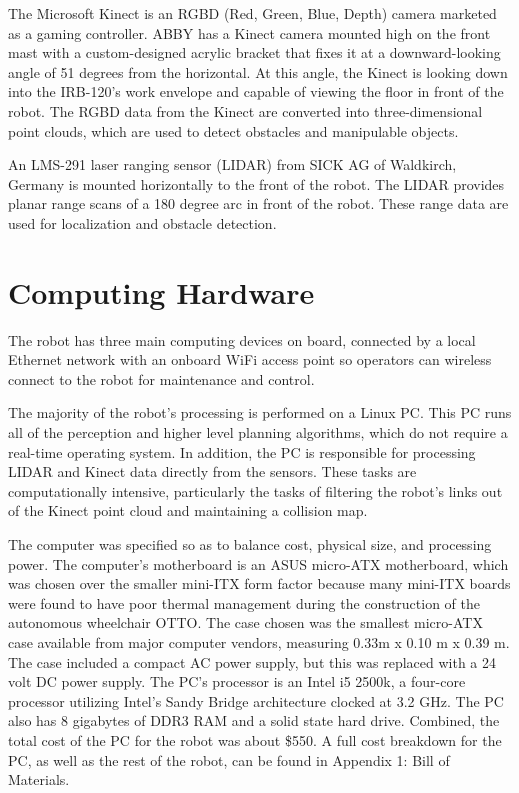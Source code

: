 \documentclass[]{cwru} %
\begin{document}
The Microsoft Kinect is an RGBD (Red, Green, Blue, Depth) camera
marketed as a gaming controller. ABBY has a Kinect camera mounted high
on the front mast with a custom-designed acrylic bracket that fixes it
at a downward-looking angle of 51 degrees from the horizontal. At this
angle, the Kinect is looking down into the IRB-120's work envelope and
capable of viewing the floor in front of the robot. The RGBD data from
the Kinect are converted into three-dimensional point clouds, which are
used to detect obstacles and manipulable objects.

An LMS-291 laser ranging sensor (LIDAR) from SICK AG of Waldkirch,
Germany is mounted horizontally to the front of the robot. The LIDAR
provides planar range scans of a 180 degree arc in front of the robot.
These range data are used for localization and obstacle detection.

\section{Computing Hardware}
\label{computing-hw}

The robot has three main computing devices on board, connected by a
local Ethernet network with an onboard WiFi access point so operators
can wireless connect to the robot for maintenance and control.

The majority of the robot's processing is performed on a Linux PC. This
PC runs all of the perception and higher level planning algorithms,
which do not require a real-time operating system. In addition, the PC
is responsible for processing LIDAR and Kinect data directly from the
sensors. These tasks are computationally intensive, particularly the
tasks of filtering the robot's links out of the Kinect point cloud and
maintaining a collision map.

The computer was specified so as to balance cost, physical size, and
processing power. The computer's motherboard is an ASUS micro-ATX
motherboard, which was chosen over the smaller mini-ITX form factor
because many mini-ITX boards were found to have poor thermal management
during the construction of the autonomous wheelchair OTTO. The case
chosen was the smallest micro-ATX case available from major computer
vendors, measuring 0.33m x 0.10 m x 0.39 m. The case included a compact
AC power supply, but this was replaced with a 24 volt DC power supply.
The PC's processor is an Intel i5 2500k, a four-core processor utilizing
Intel's Sandy Bridge architecture clocked at 3.2 GHz. The PC also has 8
gigabytes of DDR3 RAM and a solid state hard drive. Combined, the total
cost of the PC for the robot was about \$550. A full cost breakdown for
the PC, as well as the rest of the robot, can be found in Appendix 1:
Bill of Materials.
\end{document}
